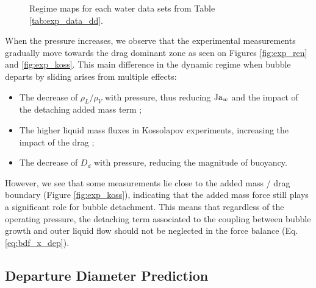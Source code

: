 \begin{figure}[h!]
\begin{center}
{\label{fig:exp_ren}
} 


	\caption{Regime maps for each water data sets from Table \ref{tab:exp_data_dd}.}	
	\label{fig:exp_maps}
\end{center}
\end{figure}

\npar


When the pressure increases, we observe that the experimental measurements gradually move towards the drag dominant zone as seen on Figures \ref{fig:exp_ren} and \ref{fig:exp_koss}. This main difference in the dynamic regime when bubble departs by sliding arises from multiple effects:

\begin{itemize}
\item The decrease of $\rho_{L}/\rho_{V}$ with pressure, thus reducing $\mathrm{Ja}_{w}$ and the impact of the detaching added mass term ;
\item The higher liquid mass fluxes in Kossolapov experiments, increasing the impact of the drag ;
\item The decrease of $D_{d}$ with pressure, reducing the magnitude of buoyancy.
\end{itemize}

However, we see that some measurements lie close to the added mass / drag boundary (Figure \ref{fig:exp_koss}), indicating that the added mass force still plays a significant role for bubble detachment. This means that regardless of the operating pressure, the detaching term associated to the coupling between bubble growth and outer liquid flow should not be neglected in the force balance (Eq. \ref{eq:bdf_x_dep}).




\subsection{Departure Diameter Prediction}\label{subsec:Dd_pred}

